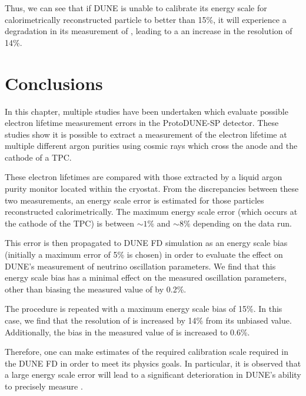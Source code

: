 Thus, we can see that if DUNE is unable to calibrate its energy scale for calorimetrically reconstructed particle to better than 15\%, it will experience a degradation in its measurement of \dcp, leading to a an increase in the \dcp resolution of 14\%.

\section{Conclusions}
\label{sec:pdune_calibration:conclusions}

In this chapter, multiple studies have been undertaken which evaluate possible electron lifetime measurement errors in the ProtoDUNE-SP detector.
These studies show it is possible to extract a measurement of the electron lifetime at multiple different argon purities using cosmic rays which cross the anode and the cathode of a TPC.

These electron lifetimes are compared with those extracted by a liquid argon purity monitor located within the cryostat.
From the discrepancies between these two measurements, an energy scale error is estimated for those particles reconstructed calorimetrically.
The maximum energy scale error (which occurs at the cathode of the TPC) is between $\sim 1\%$ and $\sim 8\%$ depending on the data run.

This error is then propagated to DUNE FD simulation as an energy scale bias (initially a maximum error of 5\% is chosen) in order to evaluate the effect on DUNE's measurement of neutrino oscillation parameters.
We find that this energy scale bias has a minimal effect on the measured oscillation parameters, other than biasing the measured value of  by 0.2\%.

The procedure is repeated with a maximum energy scale bias of 15\%. 
In this case, we find that the resolution of \dcp is increased by 14\% from its unbiased value.
Additionally, the bias in the measured value of  is increased to 0.6\%.

Therefore, one can make estimates of the required calibration scale required in the DUNE FD in order to meet its physics goals.
In particular, it is observed that a large energy scale error will lead to a significant deterioration in DUNE's ability to precisely measure \dcp.